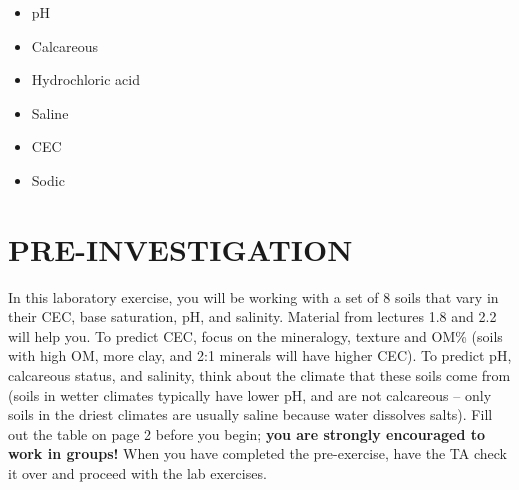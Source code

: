 \documentclass[
  letterpaper,
  twocolumn,
  portrait]{scrbook}
\providecommand{\tightlist}{%
  \setlength{\itemsep}{0pt}\setlength{\parskip}{0pt}}\usepackage{longtable,booktabs,array}
\begin{document}
\begin{tcolorbox}[enhanced jigsaw, colframe=quarto-callout-tip-color-frame, coltitle=black, arc=.35mm, breakable, bottomrule=.15mm, colback=white, rightrule=.15mm, toprule=.15mm, opacityback=0, bottomtitle=1mm, left=2mm, titlerule=0mm, leftrule=.75mm, opacitybacktitle=0.6, toptitle=1mm, title=\textcolor{quarto-callout-tip-color}{\faLightbulb}\hspace{0.5em}{Key Words \& Concepts}, colbacktitle=quarto-callout-tip-color!10!white]

\begin{itemize}
\tightlist
\item
  pH
\item
  Calcareous
\item
  Hydrochloric acid
\item
  Saline
\item
  CEC
\item
  Sodic
\end{itemize}

\end{tcolorbox}

\hypertarget{pre-investigation}{%
\section{PRE-INVESTIGATION}\label{pre-investigation}}

In this laboratory exercise, you will be working with a set of 8 soils
that vary in their CEC, base saturation, pH, and salinity. Material from
lectures 1.8 and 2.2 will help you. To predict CEC, focus on the
mineralogy, texture and OM\% (soils with high OM, more clay, and 2:1
minerals will have higher CEC). To predict pH, calcareous status, and
salinity, think about the climate that these soils come from (soils in
wetter climates typically have lower pH, and are not calcareous -- only
soils in the driest climates are usually saline because water dissolves
salts). Fill out the table on page 2 before you begin; \textbf{you are
strongly encouraged to work in groups!} When you have completed the
pre-exercise, have the TA check it over and proceed with the lab
exercises.

 
  \providecommand{\huxb}[2]{\arrayrulecolor[RGB]{#1}\global\arrayrulewidth=#2pt}
  \providecommand{\huxvb}[2]{\color[RGB]{#1}\vrule width #2pt}
  \providecommand{\huxtpad}[1]{\rule{0pt}{#1}}
  \providecommand{\huxbpad}[1]{\rule[-#1]{0pt}{#1}}
\end{document}
